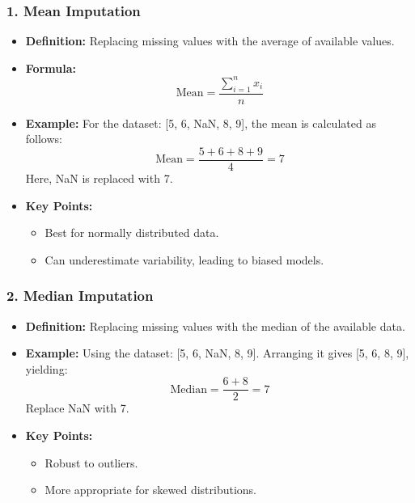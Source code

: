 \documentclass[aspectratio=169]{beamer}
\begin{document}
\begin{frame}[fragile]
    \frametitle{1. Mean Imputation}
    \begin{itemize}
        \item \textbf{Definition:} Replacing missing values with the average of available values.
        \item \textbf{Formula:} 
        \begin{equation}
            \text{Mean} = \frac{\sum_{i=1}^{n} x_i}{n}
        \end{equation}
        \item \textbf{Example:} For the dataset: [5, 6, NaN, 8, 9], the mean is calculated as follows:
        \begin{equation}
            \text{Mean} = \frac{5 + 6 + 8 + 9}{4} = 7
        \end{equation}
        Here, NaN is replaced with 7.
        \item \textbf{Key Points:}
        \begin{itemize}
            \item Best for normally distributed data.
            \item Can underestimate variability, leading to biased models.
        \end{itemize}
    \end{itemize}
\end{frame}

\begin{frame}[fragile]
    \frametitle{2. Median Imputation}
    \begin{itemize}
        \item \textbf{Definition:} Replacing missing values with the median of the available data.
        \item \textbf{Example:} Using the dataset: [5, 6, NaN, 8, 9]. Arranging it gives [5, 6, 8, 9], yielding:
        \begin{equation}
            \text{Median} = \frac{6 + 8}{2} = 7
        \end{equation}
        Replace NaN with 7.
        \item \textbf{Key Points:}
        \begin{itemize}
            \item Robust to outliers.
            \item More appropriate for skewed distributions.
        \end{itemize}
    \end{itemize}
\end{frame}
\end{document}
